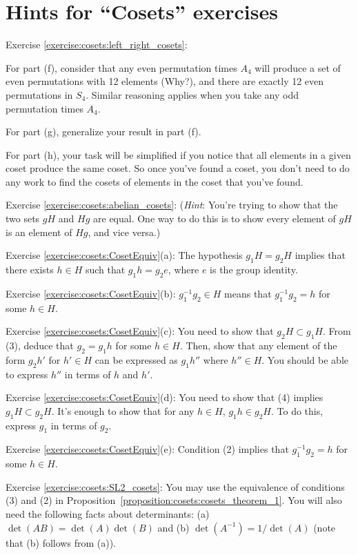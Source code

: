 \section{Hints for ``Cosets'' exercises}
\label{sec:Cosets:Hints} 

\noindent Exercise \ref{exercise:cosets:left_right_cosets}: 

For part (f), consider that any even permutation times $A_4$ will produce a set of even permutations with 12 elements (Why?), and there are exactly 12 even permutations in $S_4$.  Similar reasoning applies when you take any odd permutation times $A_4$.

For part (g), generalize your result in part (f).

For part (h), your task will be simplified if you notice that all elements in a given coset produce the same coset. So once you've found a coset, you don't need to do any work to find the cosets of elements in the coset that you've found.


\noindent Exercise \ref{exercise:cosets:abelian_cosets}:  (\emph{Hint}: You're trying to show that the two sets $gH$ and $Hg$ are equal. One way to do this is to show every element of $gH$ is an element of $Hg$, and vice versa.)


\noindent Exercise \ref{exercise:cosets:CosetEquiv}(a): The hypothesis $g_1 H = g_2 H$ implies that there exists $h \in H$ such that $g_1 h  = g_2 e$, where $e$ is the group identity. 

\noindent Exercise \ref{exercise:cosets:CosetEquiv}(b):   $g_1^{-1} g_2 \in H$ means that $g_1^{-1} g_2 = h$ for some $h \in H$. 

\noindent Exercise \ref{exercise:cosets:CosetEquiv}(c):   You need to show that $g_2 H \subset g_1 H$. From (3), deduce that $g_2 = g_1 h$ for some $h \in H$. Then, show that any element of the form $g_2 h'$ for $h' \in H$ can be expressed as $g_1 h''$ where $h'' \in H$. You should be able to express $h''$ in terms of $h$ and $h'$.

\noindent Exercise \ref{exercise:cosets:CosetEquiv}(d):   You need to show that (4) implies $g_1H \subset g_2H$. It's enough to show that for any $h \in H$,  $g_1 h \in g_2 H$. To do this, express $g_1$ in terms of $g_2$. 

\noindent Exercise \ref{exercise:cosets:CosetEquiv}(e):    Condition (2) implies that $g_1^{-1} g_2 = h$ for some $h \in H$.

\noindent Exercise \ref{exercise:cosets:SL2_cosets}:  You may use the equivalence of conditions (3) and (2) in Proposition~\ref{proposition:cosets:cosets_theorem_1}.  You will also need the following facts about determinants:  (a) $\det(AB) = \det(A)\det(B)$ and (b) $\det(A^{-1}) = 1/\det(A)$  (note that (b) follows from (a)).


